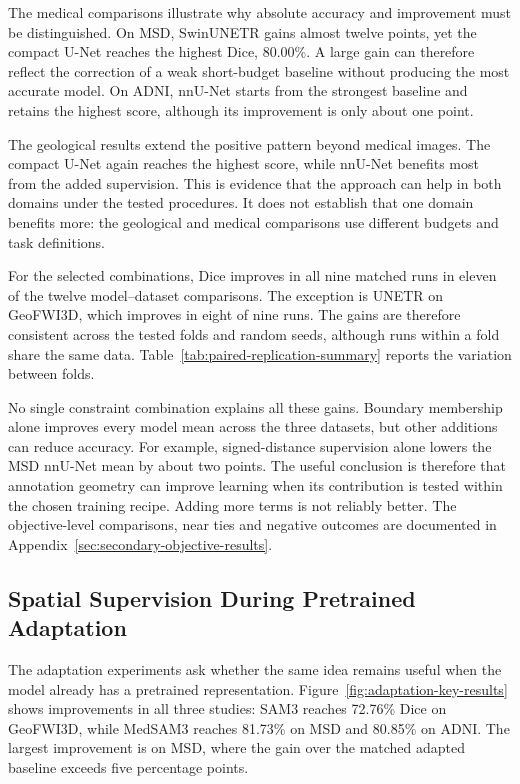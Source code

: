 \documentclass[12pt,a4paper]{article}
\begin{document}
The medical comparisons illustrate why absolute accuracy and improvement
must be distinguished. On MSD, SwinUNETR gains almost twelve points, yet
the compact U-Net reaches the highest Dice, 80.00\%. A large gain can
therefore reflect the correction of a weak short-budget baseline without
producing the most accurate model. On ADNI, nnU-Net starts from the
strongest baseline and retains the highest score, although its improvement
is only about one point.

The geological results extend the positive pattern beyond medical images.
The compact U-Net again reaches the highest score, while nnU-Net benefits
most from the added supervision. This is evidence that the approach can
help in both domains under the tested procedures. It does not establish
that one domain benefits more: the geological and medical comparisons
use different budgets and task definitions.

For the selected combinations, Dice improves in all nine matched runs in
eleven of the twelve model--dataset comparisons. The exception is UNETR
on GeoFWI3D, which improves in eight of nine runs. The gains are therefore
consistent across the tested folds and random seeds, although runs within
a fold share the same data. Table~\ref{tab:paired-replication-summary}
reports the variation between folds.

No single constraint combination explains all these gains. Boundary
membership alone improves every model mean across the three datasets,
but other additions can reduce accuracy. For example, signed-distance
supervision alone lowers the MSD nnU-Net mean by about two points.
The useful conclusion is therefore that annotation geometry can improve
learning when its contribution is tested within the chosen training
recipe. Adding more terms is not reliably better. The objective-level
comparisons, near ties and negative outcomes are documented in
Appendix~\ref{sec:secondary-objective-results}.

\FloatBarrier
\subsection{Spatial Supervision During Pretrained Adaptation}
\label{sec:sam3-results}\label{sec:medsam-results}\label{sec:medsam-adni-results}

The adaptation experiments ask whether the same idea remains useful when
the model already has a pretrained representation. Figure~\ref{fig:adaptation-key-results}
shows improvements in all three studies: SAM3 reaches 72.76\% Dice on
GeoFWI3D, while MedSAM3 reaches 81.73\% on MSD and 80.85\% on ADNI.
The largest improvement is on MSD, where the gain over the matched
adapted baseline exceeds five percentage points.
\end{document}

